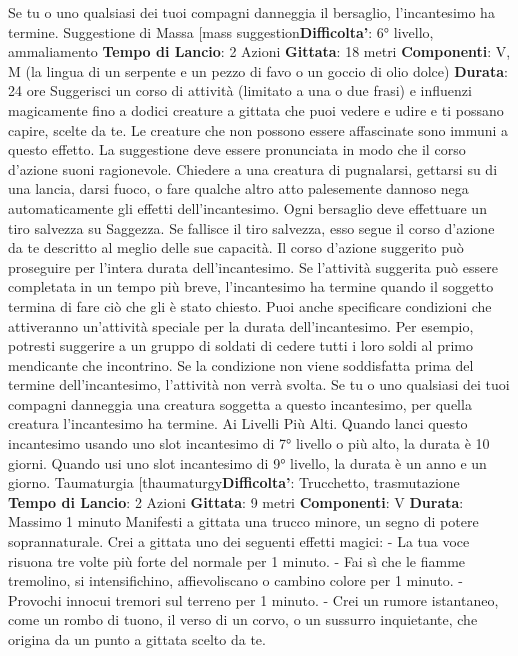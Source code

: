 \begin{multicols}{2}
Se tu o uno qualsiasi dei tuoi compagni danneggia il
bersaglio, l’incantesimo ha termine.
Suggestione di Massa
[mass suggestion\textbf{Difficolta'}:
6° livello, ammaliamento
\textbf{Tempo di Lancio}: 2 Azioni
\textbf{Gittata}: 18 metri
\textbf{Componenti}: V, M (la lingua di un serpente e un pezzo
di favo o un goccio di olio dolce)
\textbf{Durata}: 24 ore
Suggerisci un corso di attività (limitato a una o due
frasi) e influenzi magicamente fino a dodici creature a
gittata che puoi vedere e udire e ti possano capire,
scelte da te. Le creature che non possono essere
affascinate sono immuni a questo effetto. La
suggestione deve essere pronunciata in modo che il
corso d’azione suoni ragionevole. Chiedere a una
creatura di pugnalarsi, gettarsi su di una lancia, darsi
fuoco, o fare qualche altro atto palesemente dannoso
nega automaticamente gli effetti dell’incantesimo.
Ogni bersaglio deve effettuare un tiro salvezza su
Saggezza. Se fallisce il tiro salvezza, esso segue il
corso d’azione da te descritto al meglio delle sue
capacità. Il corso d’azione suggerito può proseguire per
l’intera durata dell’incantesimo. Se l’attività suggerita
può essere completata in un tempo più breve,
l’incantesimo ha termine quando il soggetto termina di
fare ciò che gli è stato chiesto.
Puoi anche specificare condizioni che attiveranno
un’attività speciale per la durata dell’incantesimo. Per
esempio, potresti suggerire a un gruppo di soldati di
cedere tutti i loro soldi al primo mendicante che
incontrino. Se la condizione non viene soddisfatta prima
del termine dell’incantesimo, l’attività non verrà svolta.
Se tu o uno qualsiasi dei tuoi compagni danneggia una
creatura soggetta a questo incantesimo, per quella
creatura l’incantesimo ha termine.
Ai Livelli Più Alti. Quando lanci questo incantesimo
usando uno slot incantesimo di 7° livello o più alto, la
durata è 10 giorni. Quando usi uno slot incantesimo di
9° livello, la durata è un anno e un giorno.
Taumaturgia
[thaumaturgy\textbf{Difficolta'}:
Trucchetto, trasmutazione
\textbf{Tempo di Lancio}: 2 Azioni
\textbf{Gittata}: 9 metri
\textbf{Componenti}: V
\textbf{Durata}: Massimo 1 minuto
Manifesti a gittata una trucco minore, un segno di
potere soprannaturale. Crei a gittata uno dei seguenti
effetti magici:
- La tua voce risuona tre volte più forte del normale
per 1 minuto.
- Fai sì che le fiamme tremolino, si intensifichino,
affievoliscano o cambino colore per 1 minuto.
- Provochi innocui tremori sul terreno per 1 minuto.
- Crei un rumore istantaneo, come un rombo di tuono,
il verso di un corvo, o un sussurro inquietante, che
origina da un punto a gittata scelto da te.

\end{multicols}
